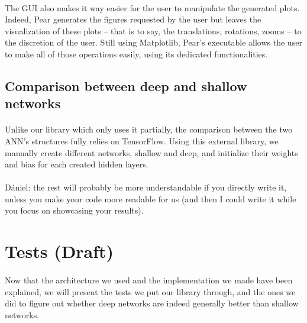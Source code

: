 \documentclass[a4paper]{article}
\begin{document}
\paragraph{}The GUI also makes it way easier for the user to manipulate the generated plots. Indeed, Pear generates the figures requested by the user but leaves the visualization of these plots -- that is to say, the translations, rotations, zooms -- to the discretion of the user. Still using Matplotlib, Pear's executable allows the user to make all of those operations easily, using its dedicated functionalities.


\subsection{Comparison between deep and shallow networks}
\paragraph{}Unlike our library which only uses it partially, the comparison between the two ANN's structures fully relies on TensorFlow. Using this external library, we manually create different networks, shallow and deep, and initialize their weights and bias for each created hidden layers. 

\paragraph{}D\'aniel: the rest will probably be more understandable if you directly write it, unless you make your code more readable for us (and then I could write it while you focus on showcasing your results).


\section{Tests (Draft)}
\paragraph{}Now that the architecture we used and the implementation we made have been explained, we will present the tests we put our library through, and the ones we did to figure out whether deep networks are indeed generally better than shallow networks.
\end{document}
